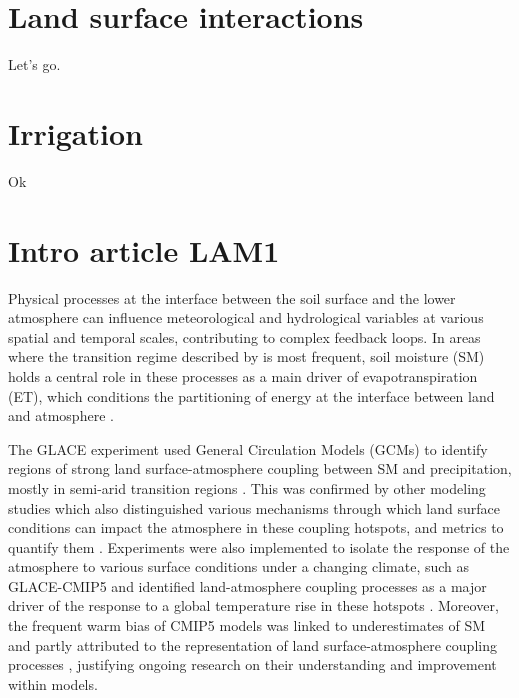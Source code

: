 \section{Land surface interactions}
Let's go.
\section{Irrigation}
Ok
\section{Intro article LAM1}
Physical processes at the interface between the soil surface and the lower atmosphere can influence meteorological 
and hydrological 
variables at various spatial and temporal scales, contributing to complex feedback loops.
In areas where the transition regime described by \cite{Budyko_1956, Budyko_1974} is most frequent, soil moisture (SM) holds a central role in these processes as a main driver of evapotranspiration (ET), which conditions the partitioning of energy at the interface between land and atmosphere \citep{betts_fife_1995, seneviratne_investigating_2010}. 
 
The GLACE experiment used General Circulation Models (GCMs) to identify regions of strong land surface-atmosphere coupling between SM and precipitation, mostly in semi-arid transition regions \citep{koster_regions_2004}. This was confirmed by other modeling studies which also distinguished various mechanisms through which land surface conditions can impact the atmosphere in these coupling hotspots, and metrics to quantify them \citep{dirmeyer_terrestrial_2011, zou_precipitation_2023}.
Experiments were also implemented to isolate the response of the atmosphere to various surface conditions under a changing climate, such as GLACE-CMIP5 \citep{seneviratne_impact_2013} and identified land-atmosphere coupling processes as a major driver of the response to a global temperature rise in these hotspots \citep{berg_interannual_2015}. 
Moreover, the frequent warm bias of CMIP5 models \citep{christensen_temperature_2012, mueller_systematic_2014} was linked to underestimates of SM \citep{al-yaari_satellite-based_2019} and partly attributed to the representation of land surface-atmosphere coupling processes \citep{cheruy_combined_2013, cheruy_role_2014}, justifying ongoing research on their understanding and improvement within models.

